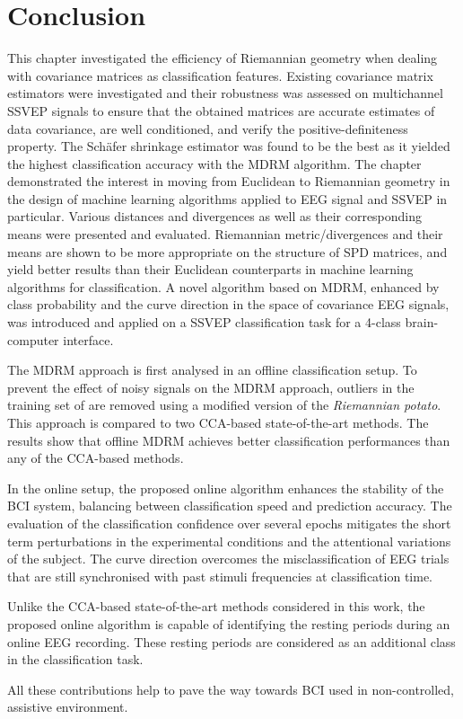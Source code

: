 \section{Conclusion}
\label{sec:riem-conclusion}

This chapter investigated the efficiency of Riemannian geometry when dealing with covariance matrices as classification features.
Existing covariance matrix estimators were investigated and their robustness was assessed on multichannel SSVEP signals to ensure that the obtained matrices are accurate estimates of data covariance, are well conditioned, and verify the positive-definiteness property. 
The Sch\"afer shrinkage estimator was found to be the best as it yielded the highest classification accuracy with the MDRM algorithm.
The chapter demonstrated the interest in moving from Euclidean to Riemannian geometry in the design of machine learning algorithms applied to EEG signal and SSVEP in particular. 
Various distances and divergences as well as their corresponding means were presented and evaluated. 
Riemannian metric/divergences and their means are shown to be more appropriate on the structure of SPD matrices, and yield better results than their Euclidean counterparts in machine learning algorithms for classification.
A novel algorithm based on MDRM, enhanced by class probability and the curve direction in the space of covariance EEG signals, was introduced and applied on a SSVEP classification task for a 4-class brain-computer interface. 

The MDRM approach is first analysed in an offline classification setup.
To prevent the effect of noisy signals on the MDRM approach, outliers in the training set of are removed using a modified version of the \textit{Riemannian potato}.  
This approach is compared to two CCA-based state-of-the-art methods. %
The results show that offline MDRM achieves better classification performances than any of the CCA-based methods.

In the online setup, the proposed online algorithm enhances the stability of the BCI system, balancing between classification speed and prediction accuracy. 
The evaluation of the classification confidence over several epochs mitigates the short term perturbations in the experimental conditions and the attentional variations of the subject.
The curve direction overcomes the misclassification of EEG trials that are still synchronised with past stimuli frequencies at classification time.

Unlike the CCA-based state-of-the-art methods considered in this work, the proposed online algorithm is capable of identifying the resting periods during an online EEG recording. 
These resting periods are considered as an additional class in the classification task.

All these contributions help to pave the way towards BCI used in non-controlled, assistive environment. 